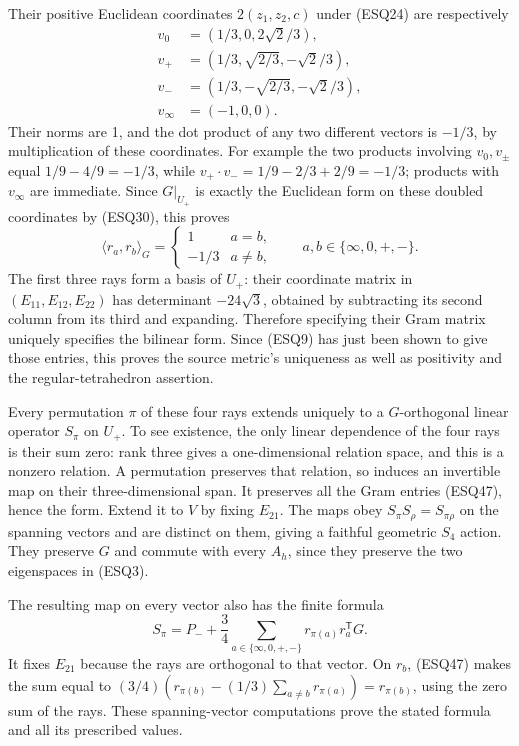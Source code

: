 \documentclass[
  10pt,
  a4paper,
]{article}
\begin{document}
Their positive Euclidean coordinates \(2(z_1,z_2,c)\) under (ESQ24) are
respectively \[
\begin{aligned}
v_0&=(1/3,0,2\sqrt2/3),\\
v_+&=(1/3,\sqrt{2/3},-\sqrt2/3),\\
v_-&=(1/3,-\sqrt{2/3},-\sqrt2/3),\\
v_\infty&=(-1,0,0).
\end{aligned}
\tag{ESQ46}
\] Their norms are 1, and the dot product of any two different vectors
is \(-1/3\), by multiplication of these coordinates. For example the two
products involving \(v_0,v_\pm\) equal \(1/9-4/9=-1/3\), while
\(v_+\cdot v_-=1/9-2/3+2/9=-1/3\); products with \(v_\infty\) are
immediate. Since \(G|_{U_+}\) is exactly the Euclidean form on these
doubled coordinates by (ESQ30), this proves \[
\langle r_a,r_b\rangle_G=
\begin{cases}1&a=b,\\-1/3&a\ne b,\end{cases}
\qquad a,b\in\{\infty,0,+,-\}.
\tag{ESQ47}
\] The first three rays form a basis of \(U_+\): their coordinate matrix
in \((E_{11},E_{12},E_{22})\) has determinant \(-24\sqrt3\), obtained by
subtracting its second column from its third and expanding. Therefore
specifying their Gram matrix uniquely specifies the bilinear form. Since
(ESQ9) has just been shown to give those entries, this proves the source
metric's uniqueness as well as positivity and the regular-tetrahedron
assertion.

Every permutation \(\pi\) of these four rays extends uniquely to a
\(G\)-orthogonal linear operator \(S_\pi\) on \(U_+\). To see existence,
the only linear dependence of the four rays is their sum zero: rank
three gives a one-dimensional relation space, and this is a nonzero
relation. A permutation preserves that relation, so induces an
invertible map on their three-dimensional span. It preserves all the
Gram entries (ESQ47), hence the form. Extend it to \(V\) by fixing
\(E_{21}\). The maps obey \(S_\pi S_\rho=S_{\pi\rho}\) on the spanning
vectors and are distinct on them, giving a faithful geometric \(S_4\)
action. They preserve \(G\) and commute with every \(A_h\), since they
preserve the two eigenspaces in (ESQ3).

The resulting map on every vector also has the finite formula \[
S_\pi=P_-+\frac34\sum_{a\in\{\infty,0,+,-\}}
r_{\pi(a)}r_a^{\mathsf T}G.
\tag{ESQ47a}
\] It fixes \(E_{21}\) because the rays are orthogonal to that vector.
On \(r_b\), (ESQ47) makes the sum equal to
\((3/4)(r_{\pi(b)}-(1/3)\sum_{a\ne b}r_{\pi(a)})=r_{\pi(b)}\), using the
zero sum of the rays. These spanning-vector computations prove the
stated formula and all its prescribed values.
\end{document}
